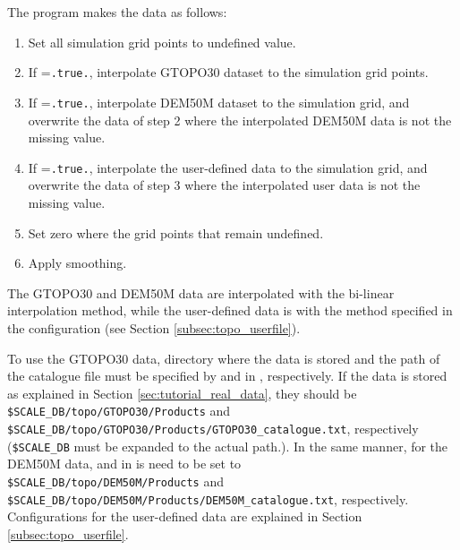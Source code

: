 The program makes the data as follows:
\begin{enumerate}[1)]
 \item Set all simulation grid points to undefined value.
 \item If =\verb|.true.|, interpolate GTOPO30 dataset to the simulation grid points.
 \item If =\verb|.true.|, interpolate DEM50M dataset to the simulation grid, and overwrite the data of step 2 where the interpolated DEM50M data is not the missing value.
 \item If =\verb|.true.|, interpolate the user-defined data to the simulation grid, and overwrite the data of step 3 where the interpolated user data is not the missing value.
 \item Set zero where the grid points that remain undefined.
 \item Apply smoothing.
\end{enumerate}
The GTOPO30 and DEM50M data are interpolated with the bi-linear interpolation method, while the user-defined data is with the method specified in the configuration (see Section \ref{subsec:topo_userfile}).

To use the GTOPO30 data, directory where the data is stored and the path of the catalogue file must be specified by  and  in , respectively.
If the data is stored as explained in Section \ref{sec:tutorial_real_data}, they should be \\ \verb|$SCALE_DB/topo/GTOPO30/Products| and \verb|$SCALE_DB/topo/GTOPO30/Products/GTOPO30_catalogue.txt|, respectively (\verb|$SCALE_DB| must be expanded to the actual path.).
In the same manner, for the DEM50M data,  and  in  is need to be set to \\ \verb|$SCALE_DB/topo/DEM50M/Products| and \verb|$SCALE_DB/topo/DEM50M/Products/DEM50M_catalogue.txt|, respectively.
Configurations for the user-defined data are explained in Section \ref{subsec:topo_userfile}.

